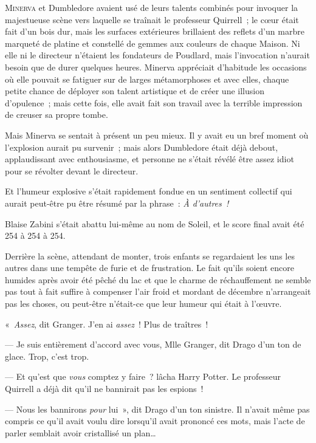 
\lettrine{M}{inerva} et Dumbledore avaient usé de leurs talents combinés pour invoquer la majestueuse scène vers laquelle se traînait le professeur Quirrell~; le cœur était fait d'un bois dur, mais les surfaces extérieures brillaient des reflets d'un marbre marqueté de platine et constellé de gemmes aux couleurs de chaque Maison. Ni elle ni le directeur n'étaient les fondateurs de Poudlard, mais l'invocation n'aurait besoin que de durer quelques heures. Minerva appréciait d'habitude les occasions où elle pouvait se fatiguer sur de larges métamorphoses et avec elles, chaque petite chance de déployer son talent artistique et de créer une illusion d'opulence~; mais cette fois, elle avait fait son travail avec la terrible impression de creuser sa propre tombe.

Mais Minerva se sentait à présent un peu mieux. Il y avait eu un bref moment où l'explosion aurait pu survenir~; mais alors Dumbledore était déjà debout, applaudissant avec enthousiasme, et personne ne s'était révélé être assez idiot pour se révolter devant le directeur.

Et l'humeur explosive s'était rapidement fondue en un sentiment collectif qui aurait peut-être pu être résumé par la phrase~: \emph{À d'autres~!}

Blaise Zabini s'était abattu lui-même au nom de Soleil, et le score final avait été 254 à 254 à 254.

\later

Derrière la scène, attendant de monter, trois enfants se regardaient les uns les autres dans une tempête de furie et de frustration. Le fait qu'ils soient encore humides après avoir été pêché du lac et que le charme de réchauffement ne semble pas tout à fait suffire à compenser l'air froid et mordant de décembre n'arrangeait pas les choses, ou peut-être n'était-ce que leur humeur qui était à l'œuvre.

«~\emph{Assez}, dit Granger. J'en ai \emph{assez}~! Plus de traîtres~!

--- Je suis entièrement d'accord avec vous, Mlle Granger, dit Drago d'un ton de glace. Trop, c'est trop.

--- Et qu'est que \emph{vous} comptez y faire~? lâcha Harry Potter. Le professeur Quirrell a déjà dit qu'il ne bannirait pas les espions~!

--- Nous les bannirons \emph{pour} lui~», dit Drago d'un ton sinistre. Il n'avait même pas compris ce qu'il avait voulu dire lorsqu'il avait prononcé ces mots, mais l'acte de parler semblait avoir cristallisé un plan…

